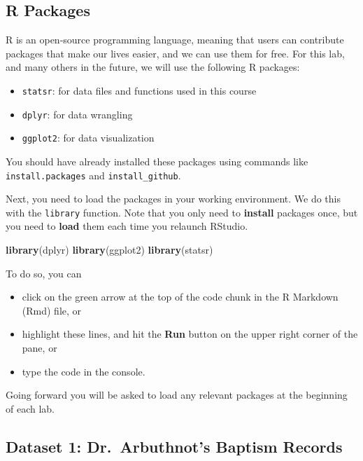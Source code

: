 \documentclass[
]{article}
\newenvironment{Shaded}{\begin{snugshade}}{\end{snugshade}}
\newcommand{\FunctionTok}[1]{\textcolor[rgb]{0.13,0.29,0.53}{\textbf{#1}}}
\newcommand{\NormalTok}[1]{#1}
\providecommand{\tightlist}{%
  \setlength{\itemsep}{0pt}\setlength{\parskip}{0pt}}
\begin{document}
\subsection{R Packages}\label{r-packages}

R is an open-source programming language, meaning that users can
contribute packages that make our lives easier, and we can use them for
free. For this lab, and many others in the future, we will use the
following R packages:

\begin{itemize}
\tightlist
\item
  \texttt{statsr}: for data files and functions used in this course
\item
  \texttt{dplyr}: for data wrangling
\item
  \texttt{ggplot2}: for data visualization
\end{itemize}

You should have already installed these packages using commands like
\texttt{install.packages} and \texttt{install\_github}.

Next, you need to load the packages in your working environment. We do
this with the \texttt{library} function. Note that you only need to
\textbf{install} packages once, but you need to \textbf{load} them each
time you relaunch RStudio.

\begin{Shaded}
\begin{Highlighting}[]
\FunctionTok{library}\NormalTok{(dplyr)}
\FunctionTok{library}\NormalTok{(ggplot2)}
\FunctionTok{library}\NormalTok{(statsr)}
\end{Highlighting}
\end{Shaded}

To do so, you can

\begin{itemize}
\tightlist
\item
  click on the green arrow at the top of the code chunk in the R
  Markdown (Rmd) file, or
\item
  highlight these lines, and hit the \textbf{Run} button on the upper
  right corner of the pane, or
\item
  type the code in the console.
\end{itemize}

Going forward you will be asked to load any relevant packages at the
beginning of each lab.

\subsection{Dataset 1: Dr.~Arbuthnot's Baptism
Records}\label{dataset-1-dr.-arbuthnots-baptism-records}
\end{document}
